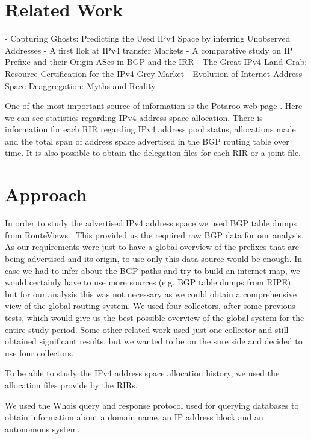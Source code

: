 \documentclass[11pt]{report}
\begin{document}
\section{Related Work}
- Capturing Ghosts: Predicting the Used IPv4 Space by inferring Unobserved Addresses
- A first llok at IPv4 transfer Markets
- A comparative study on IP Prefixe and their Origin ASes in BGP and the IRR
- The Great IPv4 Land Grab: Resource Certification for the IPv4 Grey Market
- Evolution of Internet Address Space Deaggregation: Myths and Reality


One of the most important source of information is the Potaroo web page \cite{Potaroo}. 
Here we can see statistics regarding IPv4 address space allocation. There is information for each RIR regarding IPv4 address pool status, allocations made and the total span of address space advertised in the BGP routing table over time. It is also possible to obtain the delegation files for each RIR or a joint file.

\section{Approach}

In order to study the advertised IPv4 address space we used BGP table dumps from RouteViews \cite{RouteViews}. This provided us the required raw BGP data for our analysis. As our requirements were just to have a global overview of the prefixes that are being advertised and its origin, to use only this data source would be enough. In case we had to infer about the BGP paths and try to build an internet map, we would certainly have to use more sources (e.g. BGP table dumps from RIPE), but for our analysis this was not necessary as we could obtain a comprehensive view of the global routing system.
We used four collectors, after some previous tests, which would give us the best possible overview of the global system for the entire study period. Some other related work \cite{Address_Space_Deaggregation} used just one collector and still obtained significant results, but we wanted to be on the sure side and decided to use four collectors. 

To be able to study the IPv4 address space allocation history, we used the allocation files \cite{Potaroo} provide by the RIRs.

We used the Whois \cite{Whois} query and response protocol used for querying databases to obtain information about a domain name, an IP address block and an autonomous system. 
\end{document}
